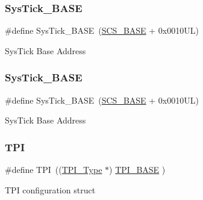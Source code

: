 \subsubsection{\texorpdfstring{Sys\+Tick\+\_\+\+B\+A\+SE}{SysTick\_BASE}\hspace{0.1cm}{\footnotesize\ttfamily [11/12]}}
{\footnotesize\ttfamily \#define Sys\+Tick\+\_\+\+B\+A\+SE~(\hyperlink{group___c_m_s_i_s__core__base_ga3c14ed93192c8d9143322bbf77ebf770}{S\+C\+S\+\_\+\+B\+A\+SE} +  0x0010\+U\+L)}

Sys\+Tick Base Address \mbox{\label{group___c_m_s_i_s__core__base_ga58effaac0b93006b756d33209e814646}} 
\subsubsection{\texorpdfstring{Sys\+Tick\+\_\+\+B\+A\+SE}{SysTick\_BASE}\hspace{0.1cm}{\footnotesize\ttfamily [12/12]}}
{\footnotesize\ttfamily \#define Sys\+Tick\+\_\+\+B\+A\+SE~(\hyperlink{group___c_m_s_i_s__core__base_ga3c14ed93192c8d9143322bbf77ebf770}{S\+C\+S\+\_\+\+B\+A\+SE} +  0x0010\+U\+L)}

Sys\+Tick Base Address \mbox{\label{group___c_m_s_i_s__core__base_ga8b4dd00016aed25a0ea54e9a9acd1239}} 
\subsubsection{\texorpdfstring{T\+PI}{TPI}\hspace{0.1cm}{\footnotesize\ttfamily [1/8]}}
{\footnotesize\ttfamily \#define T\+PI~((\hyperlink{struct_t_p_i___type}{T\+P\+I\+\_\+\+Type}       $\ast$)     \hyperlink{group___c_m_s_i_s__core__base_ga2b1eeff850a7e418844ca847145a1a68}{T\+P\+I\+\_\+\+B\+A\+SE}         )}

T\+PI configuration struct \mbox{\label{group___c_m_s_i_s__core__base_ga8b4dd00016aed25a0ea54e9a9acd1239}} 
